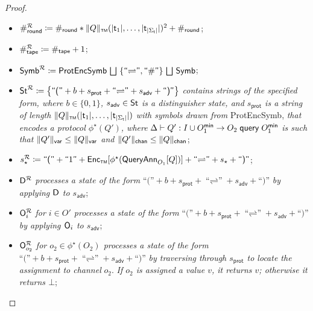 \begin{proof}
\begin{itemize}
\item $\#_{\mathsf{round}}^\mathcal{R} \coloneqq \#_{\mathsf{round}} * \Vert Q \Vert_{\scriptscriptstyle \mathsf{TM}}(|\mathsf{t}_1|,\ldots,|\mathsf{t}_{|\Sigma_\mathsf{t}|}|)^2 + \#_{\mathsf{round}}$;

\item $\#_{\mathsf{tape}}^\mathcal{R} \coloneqq \#_{\mathsf{tape}} + 1$;

\item $\mathsf{Symb}^\mathcal{R} \coloneqq \textsf{ProtEncSymb} \, \bigsqcup \ \{\textsf{``$\rightleftharpoons$''}, \textsf{``$\#$''}\} \, \bigsqcup \, \textsf{Symb}$;

\item $\mathsf{St}^\mathcal{R} \coloneqq \big\{\textsf{``(''} + b + s_\mathsf{prot} + \textsf{``$\rightleftharpoons$''} + s_\mathsf{adv} + \textsf{``)''}\big\}$ \emph{contains strings of the specified form, where $b \in \{0,1\}$, $s_\mathsf{adv} \in \mathsf{St}$ is a distinguisher state, and $s_\mathsf{prot}$ is a string of length $\Vert Q \Vert_{\scriptscriptstyle \mathsf{TM}}(|\mathsf{t}_1|,\ldots,|\mathsf{t}_{|\Sigma_\mathsf{t}|}|)$ with symbols drawn from} \textsf{ProtEncSymb}, \emph{that encodes a protocol $\phi^\star(Q')$, where} $\Delta \vdash Q' : I \cup O_1^\textsf{min} \to O_2 \;\mathsf{query}\; O_1^\textsf{min}$ \emph{is such that $\Vert Q' \Vert_{\mathsf{var}} \leq \Vert Q \Vert_{\mathsf{var}}$ and $\Vert Q' \Vert_{\mathsf{chan}} \leq \Vert Q \Vert_{\mathsf{chan}}$};

\item $s^\mathcal{R}_\star \coloneqq \textsf{``(''} + \textsf{``$1$''} + \mathsf{Enc}_{\scriptscriptstyle \mathsf{TM}}[\phi^\star(\mathsf{QueryAnn}_{O_1}[Q])] + \textsf{``$\rightleftharpoons$''} + s_\star + \textsf{``)''}$;

\item $\mathsf{D}^\mathcal{R}$ \emph{processes a state of the form} $\textsf{``(''} + b + s_\mathsf{prot} + \textsf{``$\rightleftharpoons$''} + s_\mathsf{adv} + \textsf{``)''}$ \emph{by applying $\mathsf{D}$ to $s_\mathsf{adv}$};

\item $\mathsf{O}_i^\mathcal{R}$ \emph{for $i \in O'$ processes a state of the form} $\textsf{``(''} + b + s_\mathsf{prot} + \textsf{``$\rightleftharpoons$''} + s_\mathsf{adv} + \textsf{``)''}$ \emph{by applying $\mathsf{O}_i$ to $s_\mathsf{adv}$};

\item $\mathsf{O}_{o_2}^\mathcal{R}$ \emph{for $o_2 \in \phi^\star(O_2)$ processes a state of the form} $\textsf{``(''} + b + s_\mathsf{prot} + \textsf{``$\rightleftharpoons$''} + s_\mathsf{adv} + \textsf{``)''}$ \emph{by traversing through $s_\mathsf{prot}$ to locate the assignment to channel} $o_2$. \emph{If $o_2$ is assigned a value $v$, it returns $v$; otherwise it returns $\bot$};


\end{itemize}
\end{proof}
